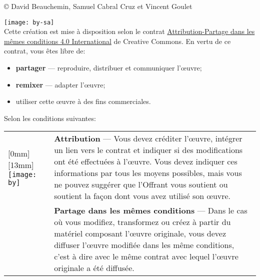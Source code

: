 \small
{\copyright} {\the\year} David Beauchemin, Samuel Cabral Cruz et Vincent Goulet \\

\vspace{\baselineskip}

\texttt{[image: by-sa]}\\%
Cette création est mise à disposition selon le contrat
\href{http://creativecommons.org/licenses/by-sa/4.0/deed.fr}{%
  Attribution-Partage dans les mêmes conditions 4.0 International} de
Creative Commons. En vertu de ce contrat, vous êtes libre de:
\begin{itemize}
\item \textbf{partager} --- reproduire, distribuer et communiquer
  l'{\oe}uvre;
\item \textbf{remixer} --- adapter l'{\oe}uvre;
\item utiliser cette {\oe}uvre à des fins commerciales.
\end{itemize}
Selon les conditions suivantes:

\begin{tabularx}{\linewidth}{@{}lX@{}}
  \raisebox{-9mm}[0mm][13mm]{%
    \texttt{[image: by]}} &
  \textbf{Attribution} --- Vous devez créditer l'{\oe}uvre, intégrer
  un lien vers le contrat et indiquer si des modifications ont été
  effectuées à l'{\oe}uvre. Vous devez indiquer ces informations par
  tous les moyens possibles, mais vous ne pouvez suggérer que
  l'Offrant vous soutient ou soutient la façon dont vous avez utilisé
  son {\oe}uvre. \\
  \raisebox{-9mm}{\texttt{[image: sa]}}
  & \textbf{Partage dans les mêmes conditions} --- Dans le cas où vous
  modifiez, transformez ou créez à partir du matériel composant
  l'{\oe}uvre originale, vous devez diffuser l'{\oe}uvre modifiée dans
  les même conditions, c'est à dire avec le même contrat avec lequel
  l'{\oe}uvre originale a été diffusée.
\end{tabularx}